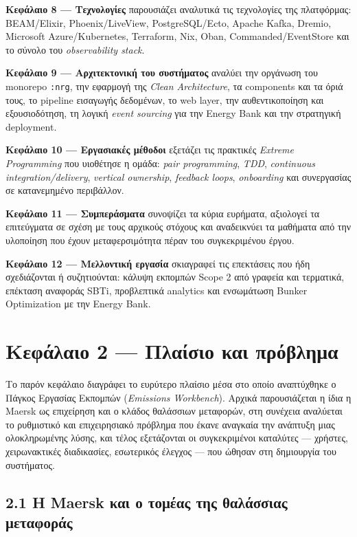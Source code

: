 \textbf{Κεφάλαιο 8 --- Τεχνολογίες} παρουσιάζει αναλυτικά τις
τεχνολογίες της πλατφόρμας: BEAM/Elixir, Phoenix/LiveView,
PostgreSQL/Ecto, Apache Kafka, Dremio, Microsoft Azure/Kubernetes,
Terraform, Nix, Oban, Commanded/EventStore και το σύνολο του
\emph{observability stack}.

\textbf{Κεφάλαιο 9 --- Αρχιτεκτονική του συστήματος} αναλύει την
οργάνωση του monorepo \texttt{:nrg}, την εφαρμογή της \emph{Clean
Architecture}, τα components και τα όριά τους, το pipeline εισαγωγής
δεδομένων, το web layer, την αυθεντικοποίηση και εξουσιοδότηση, τη
λογική \emph{event sourcing} για την Energy Bank και την στρατηγική
deployment.

\textbf{Κεφάλαιο 10 --- Εργασιακές μέθοδοι} εξετάζει τις πρακτικές
\emph{Extreme Programming} που υιοθέτησε η ομάδα: \emph{pair
programming}, \emph{TDD}, \emph{continuous integration/delivery},
\emph{vertical ownership}, \emph{feedback loops}, \emph{onboarding} και
συνεργασίας σε κατανεμημένο περιβάλλον.

\textbf{Κεφάλαιο 11 --- Συμπεράσματα} συνοψίζει τα κύρια ευρήματα,
αξιολογεί τα επιτεύγματα σε σχέση με τους αρχικούς στόχους και
αναδεικνύει τα μαθήματα από την υλοποίηση που έχουν μεταφερσιμότητα
πέραν του συγκεκριμένου έργου.

\textbf{Κεφάλαιο 12 --- Μελλοντική εργασία} σκιαγραφεί τις επεκτάσεις
που ήδη σχεδιάζονται ή συζητιούνται: κάλυψη εκπομπών Scope 2 από γραφεία
και τερματικά, επέκταση αναφοράς SBTi, προβλεπτικά analytics και
ενσωμάτωση Bunker Optimization με την Energy Bank.

\pagebreak

\chapter{Κεφάλαιο 2 --- Πλαίσιο και
πρόβλημα}\label{ux3baux3b5ux3c6ux3acux3bbux3b1ux3b9ux3bf-2-ux3c0ux3bbux3b1ux3afux3c3ux3b9ux3bf-ux3baux3b1ux3b9-ux3c0ux3c1ux3ccux3b2ux3bbux3b7ux3bcux3b1}

Το παρόν κεφάλαιο διαγράφει το ευρύτερο πλαίσιο μέσα στο οποίο
αναπτύχθηκε ο Πάγκος Εργασίας Εκπομπών (\emph{Emissions Workbench}).
Αρχικά παρουσιάζεται η ίδια η Maersk ως επιχείρηση και ο κλάδος
θαλάσσιων μεταφορών, στη συνέχεια αναλύεται το ρυθμιστικό και
επιχειρησιακό πρόβλημα που έκανε αναγκαία την ανάπτυξη μιας
ολοκληρωμένης λύσης, και τέλος εξετάζονται οι συγκεκριμένοι καταλύτες
--- χρήστες, χειρωνακτικές διαδικασίες, εσωτερικός έλεγχος --- που
ώθησαν στη δημιουργία του συστήματος.

\section{2.1 Η Maersk και ο τομέας της θαλάσσιας
μεταφοράς}\label{ux3b7-maersk-ux3baux3b1ux3b9-ux3bf-ux3c4ux3bfux3bcux3adux3b1ux3c2-ux3c4ux3b7ux3c2-ux3b8ux3b1ux3bbux3acux3c3ux3c3ux3b9ux3b1ux3c2-ux3bcux3b5ux3c4ux3b1ux3c6ux3bfux3c1ux3acux3c2}

